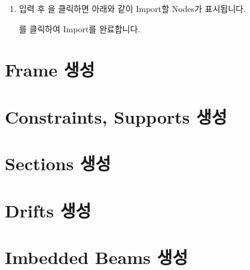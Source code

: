 \documentclass[a4paper,11pt,korean,openany,oneside]{sphinxmanual}
\begin{document}
\begin{sphinxShadowBox}
\begin{enumerate}
\newpage

\begin{center}
\noindent{}
\end{center}

\newpage

\item {} 
\sphinxAtStartPar
입력 후  \sphinxhyphen{} 을 클릭하면 아래와 같이 Import할 Nodes가 표시됩니다.

\begin{center}
\noindent{}
\end{center}

\sphinxAtStartPar
{}를 클릭하여 Import를 완료합니다.

\end{enumerate}
\end{sphinxShadowBox}

\sphinxstepscope


\section{Frame 생성}
\label{\detokenize{3_create_frames:frame}}\label{\detokenize{3_create_frames::doc}}
\sphinxstepscope


\section{Constraints, Supports 생성}
\label{\detokenize{3_create_supports:constraints-supports}}\label{\detokenize{3_create_supports::doc}}
\sphinxstepscope


\section{Sections 생성}
\label{\detokenize{3_create_sections:sections}}\label{\detokenize{3_create_sections::doc}}
\sphinxstepscope


\section{Drifts 생성}
\label{\detokenize{3_create_drifts:drifts}}\label{\detokenize{3_create_drifts::doc}}
\sphinxstepscope


\section{Imbedded Beams 생성}
\label{\detokenize{3_create_imbedded_beams:imbedded-beams}}\label{\detokenize{3_create_imbedded_beams::doc}}
\sphinxstepscope
\end{document}
